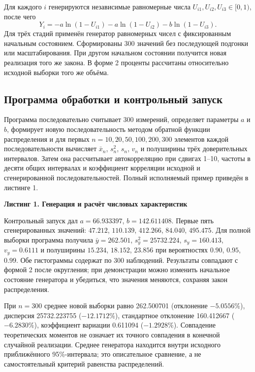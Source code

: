 \documentclass[11pt,a4paper]{article}
\begin{document}
Для каждого $i$ генерируются независимые равномерные числа $U_{i1},U_{i2},U_{i3}\in[0,1)$, после чего
\begin{equation}Y_i=-a\ln(1-U_{i1})-a\ln(1-U_{i2})-b\ln(1-U_{i3}).\end{equation}
Для трёх стадий применён генератор равномерных чисел с фиксированным начальным состоянием. Сформированы 300 значений без последующей подгонки или масштабирования. При другом начальном состоянии получится новая реализация того же закона. В форме 2 проценты рассчитаны относительно исходной выборки того же объёма.

\subsection{Программа обработки и контрольный запуск}
Программа последовательно считывает 300 измерений, определяет параметры $a$ и $b$, формирует новую последовательность методом обратной функции распределения и для первых $n=10,20,50,100,200,300$ элементов каждой последовательности вычисляет $\bar x_n$, $s_n^2$, $s_n$, $v_n$ и полуширины трёх доверительных интервалов. Затем она рассчитывает автокорреляцию при сдвигах 1--10, частоты в десяти общих интервалах и коэффициент корреляции исходной и сгенерированной последовательностей. Полный исполняемый пример приведён в листинге 1.

\begin{center}\textbf{Листинг 1. Генерация и расчёт числовых характеристик}\end{center}

Контрольный запуск дал $a=66.933397$, $b=142.611408$. Первые пять сгенерированных значений: $47.212$, $110.139$, $412.266$, $84.040$, $495.475$. Для полной выборки программа получила $\bar y=262.501$, $s_y^2=25732.224$, $s_y=160.413$, $v_y=0.6111$ и полуширины $15.234$, $18.152$, $23.856$ при вероятностях $0.90$, $0.95$, $0.99$. Обе гистограммы содержат по 300 наблюдений. Результаты совпадают с формой 2 после округления; при демонстрации можно изменить начальное состояние генератора и убедиться, что значения меняются, сохраняя закон распределения.
\begin{table}[H]\centering\caption{Форма 2. Характеристики гипоэкспоненциальной последовательности}
\small\setlength{\tabcolsep}{4pt}\end{table}
При $n=300$ среднее новой выборки равно 262.500701 (отклонение $-5.0556\%$), дисперсия 25732.223755 ($-12.1712\%$), стандартное отклонение 160.412667 ($-6.2830\%$), коэффициент вариации 0.611094 ($-1.2928\%$). Совпадение теоретических моментов не означает их точного совпадения в конечной случайной реализации. Среднее генератора находится внутри исходного приближённого 95\%-интервала; это описательное сравнение, а не самостоятельный критерий равенства распределений.
\end{document}
